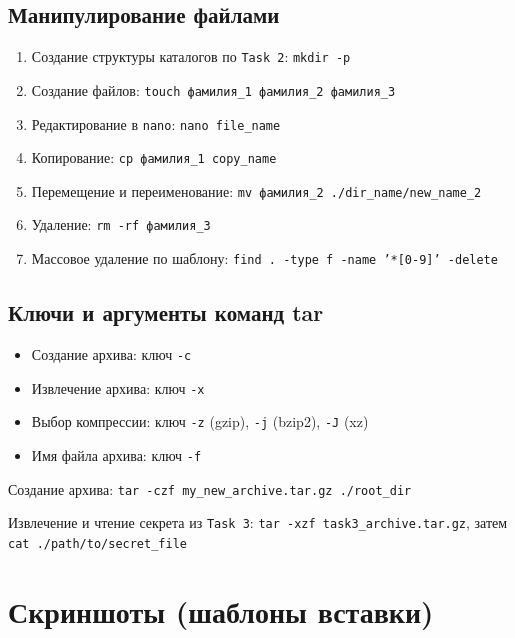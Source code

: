 \subsection{Манипулирование файлами}
\begin{enumerate}
  \item Создание структуры каталогов по \texttt{Task 2}: \texttt{mkdir -p}
  \item Создание файлов: \texttt{touch фамилия\_1 фамилия\_2 фамилия\_3}
  \item Редактирование в \texttt{nano}: \texttt{nano file\_name}
  \item Копирование: \texttt{cp фамилия\_1 copy\_name}
  \item Перемещение и переименование: \texttt{mv фамилия\_2 ./dir\_name/new\_name\_2}
  \item Удаление: \texttt{rm -rf фамилия\_3}
  \item Массовое удаление по шаблону: \texttt{find . -type f -name '*[0-9]' -delete}
\end{enumerate}

\subsection{Ключи и аргументы команд tar}
\begin{itemize}
  \item Создание архива: ключ \texttt{-c}
  \item Извлечение архива: ключ \texttt{-x}
  \item Выбор компрессии: ключ \texttt{-z} (gzip), \texttt{-j} (bzip2), \texttt{-J} (xz)
  \item Имя файла архива: ключ \texttt{-f}
\end{itemize}
Создание архива: \texttt{tar -czf my\_new\_archive.tar.gz ./root\_dir}

Извлечение и чтение секрета из \texttt{Task 3}: \texttt{tar -xzf task3\_archive.tar.gz}, затем \texttt{cat ./path/to/secret\_file}

\section{Скриншоты (шаблоны вставки)}


